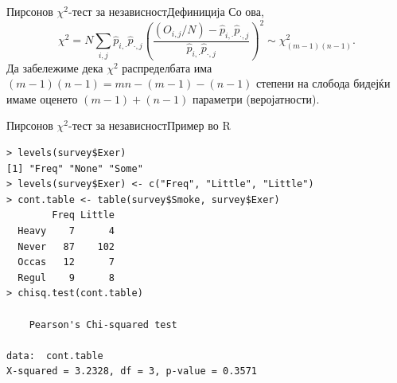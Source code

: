 \documentclass[hyperref={unicode}, xcolor={svgnames, table},
usepdftitle=false]{beamer}
\theoremstyle{remark}
\begin{document}
\begin{frame}{Пирсонов \(\chi^2\)-тест за независност}{Дефиниција}
  Со ова,
  \[
    \chi^2 = N \sum\limits_{i, j} \hat{p}_{i, \cdot} \hat{p}_{\cdot, j}
    \left(\frac{(O_{i, j} / {N}) - \hat{p}_{i, \cdot} \hat{p}_{\cdot,
          j}}{\hat{p}_{i, \cdot} \hat{p}_{\cdot, j}}\right)^2 \sim \chi^2_{(m -
      1)(n - 1)}\text{.}
  \]
  Да забележиме дека \(\chi^2\) распределбата има
  \((m - 1)(n - 1) = m n - (m - 1) - (n - 1)\) степени на слобода бидејќи имаме
  оценето \((m - 1) + (n - 1)\) параметри (веројатности).
\end{frame}


\begin{frame}[fragile]{Пирсонов \(\chi^2\)-тест за независност}{Пример во R}
\begin{verbatim}
> levels(survey$Exer)
[1] "Freq" "None" "Some"
> levels(survey$Exer) <- c("Freq", "Little", "Little")
> cont.table <- table(survey$Smoke, survey$Exer)
        Freq Little
  Heavy    7      4
  Never   87    102
  Occas   12      7
  Regul    9      8
> chisq.test(cont.table)

	Pearson's Chi-squared test

data:  cont.table
X-squared = 3.2328, df = 3, p-value = 0.3571
\end{verbatim}
\end{frame}
\end{document}
